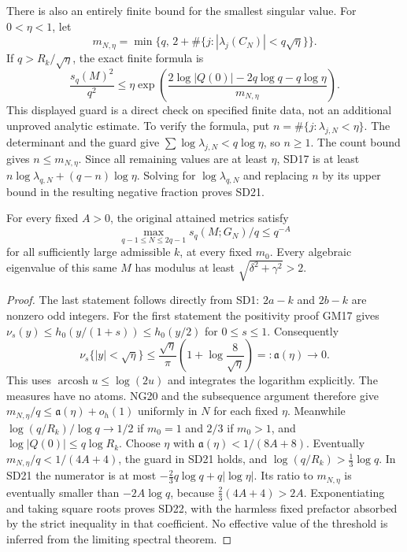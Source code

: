 \documentclass[11pt]{article}
\begin{document}
There is also an entirely finite bound for the smallest singular value.
For $0<\eta<1$, let
\begin{equation}\tag{SD20}
 m_{N,\eta}=\min\{q,\,2+\#\{j:|\lambda_j(C_N)|<q\sqrt\eta\}\}.
\end{equation}
If $q>R_k/\sqrt\eta$, the exact finite formula is
\begin{equation}\tag{SD21}
\boxed{\frac{s_q(M)^2}{q^2}
\le\eta\exp\!\left(
\frac{2\log|Q(0)|-2q\log q-q\log\eta}{m_{N,\eta}}
\right).}
\end{equation}
This displayed guard is a direct check on specified finite data, not
an additional unproved analytic estimate. To verify the formula, put
$n=\#\{j:\lambda_{j,N}<\eta\}$. The determinant and the guard give
$\sum\log\lambda_{j,N}<q\log\eta$, so $n\ge1$. The count bound
gives $n\le m_{N,\eta}$. Since all remaining values are at least
$\eta$, SD17 is at least $n\log\lambda_{q,N}+(q-n)\log\eta$.
Solving for $\log\lambda_{q,N}$ and replacing $n$ by its upper bound
in the resulting negative fraction proves SD21.

\begin{osdtheorem}
For every fixed $A>0$, the original attained metrics satisfy
\begin{equation}\tag{SD22}
\boxed{\max_{q-1\le N\le2q-1}s_q(M;G_N)/q\le q^{-A}}
\end{equation}
for all sufficiently large admissible $k$, at every fixed $m_0$.
Every algebraic eigenvalue of this same $M$ has modulus at least
$\sqrt{\delta^2+\gamma^2}>2$.
\end{osdtheorem}
\begin{proof}
The last statement follows directly from SD1: $2a-k$ and $2b-k$ are
nonzero odd integers. For the first statement the positivity proof
GM17 gives $\nu_s(y)\le h_0(y/(1+s))\le h_0(y/2)$ for $0\le s\le1$.
Consequently
\begin{equation}\tag{SD23}
\nu_s\{|y|<\sqrt\eta\}
\le\frac{\sqrt\eta}{\pi}
\left(1+\log\frac8{\sqrt\eta}\right)=:\mathfrak a(\eta)
\longrightarrow0.
\end{equation}
This uses $\operatorname{arcosh}u\le\log(2u)$ and integrates the
logarithm explicitly. The measures have no atoms. NG20 and the
subsequence argument therefore give $m_{N,\eta}/q\le
\mathfrak a(\eta)+o_h(1)$ uniformly in $N$ for each fixed $\eta$.
Meanwhile $\log(q/R_k)/\log q\to1/2$ if $m_0=1$ and $2/3$ if
$m_0>1$, and $\log|Q(0)|\le q\log R_k$. Choose $\eta$ with
$\mathfrak a(\eta)<1/(8A+8)$. Eventually $m_{N,\eta}/q<1/(4A+4)$,
the guard in SD21 holds, and $\log(q/R_k)>\tfrac13\log q$.
In SD21 the numerator is at most
$-\tfrac23q\log q+q|\log\eta|$.
Its ratio to $m_{N,\eta}$ is eventually smaller than $-2A\log q$,
because $\tfrac23(4A+4)>2A$. Exponentiating and taking square roots
proves SD22, with the harmless fixed prefactor absorbed by the strict
inequality in that coefficient. No effective value of the threshold
is inferred from the limiting spectral theorem.
\end{proof}
\end{document}

